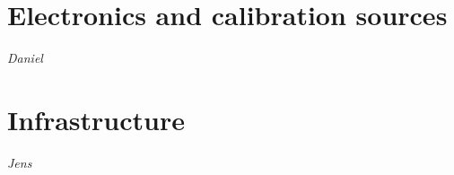 \section{Electronics and calibration sources} 
{\it Daniel} \\ 

\section{Infrastructure} 
{\it Jens} \\ 
